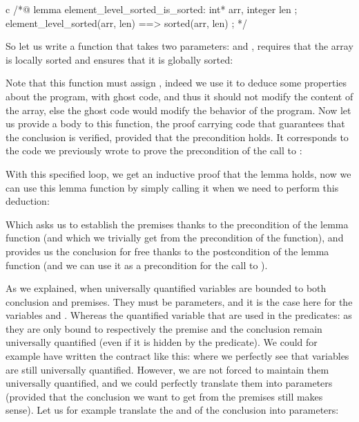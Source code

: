 \begin{CodeBlock}{c}
/*@
  lemma element_level_sorted_is_sorted:
    \forall int* arr, integer len ;
       element_level_sorted(arr, len) ==> sorted(arr, len) ;
*/
\end{CodeBlock}


So let us write a function that takes two parameters:  and
, requires that the array is locally sorted and ensures that it
is globally sorted:






Note that this function must assign , indeed
we use it to deduce some properties about the program, with ghost code, and
thus it should not modify the content of the array, else the ghost code would
modify the behavior of the program. Now let us provide a body to this function,
the proof carrying code that guarantees that the conclusion is verified, provided
that the precondition holds. It corresponds to the code we previously wrote to
prove the precondition of the call to :






With this specified loop, we get an inductive proof that the lemma holds,
now we can use this lemma function by simply calling it when we need
to perform this deduction:






Which asks us to establish the premises thanks to the precondition of the lemma
function (and which we trivially get from the precondition of the
 function), and provides us the conclusion for free
thanks to the postcondition of the lemma function (and we can use it as a
precondition for the call to ).



As we explained, when universally quantified variables are bounded to both
conclusion and premises. They must be parameters, and it is the case here for
the variables  and . Whereas the quantified
variable that are used in the predicates:
as they are only bound to respectively the premise and the conclusion remain
universally quantified (even if it is hidden by the predicate). We could for
example have written the contract like this:
where we perfectly see that variables are still universally quantified. However,
we are not forced to maintain them universally quantified, and we could
perfectly translate them into parameters (provided that the conclusion we want
to get from the premises still makes sense). Let us for example translate the
 and  of the conclusion into parameters:



